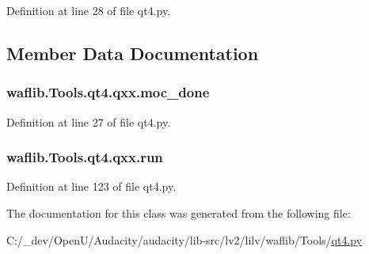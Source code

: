 Definition at line 28 of file qt4.\+py.



\subsection{Member Data Documentation}
\subsubsection[{\texorpdfstring{moc\+\_\+done}{moc_done}}]{\setlength{\rightskip}{0pt plus 5cm}waflib.\+Tools.\+qt4.\+qxx.\+moc\+\_\+done}\hypertarget{classwaflib_1_1_tools_1_1qt4_1_1qxx_a671993f2eb119aeff79f5f3563844166}{}\label{classwaflib_1_1_tools_1_1qt4_1_1qxx_a671993f2eb119aeff79f5f3563844166}


Definition at line 27 of file qt4.\+py.

\subsubsection[{\texorpdfstring{run}{run}}]{\setlength{\rightskip}{0pt plus 5cm}waflib.\+Tools.\+qt4.\+qxx.\+run\hspace{0.3cm}{\ttfamily [static]}}\hypertarget{classwaflib_1_1_tools_1_1qt4_1_1qxx_ad4580b64bdff0724884b6dba4c9bbe5d}{}\label{classwaflib_1_1_tools_1_1qt4_1_1qxx_ad4580b64bdff0724884b6dba4c9bbe5d}


Definition at line 123 of file qt4.\+py.



The documentation for this class was generated from the following file\+:\begin{DoxyCompactItemize}
\item 
C\+:/\+\_\+dev/\+Open\+U/\+Audacity/audacity/lib-\/src/lv2/lilv/waflib/\+Tools/\hyperlink{lilv_2waflib_2_tools_2qt4_8py}{qt4.\+py}\end{DoxyCompactItemize}
